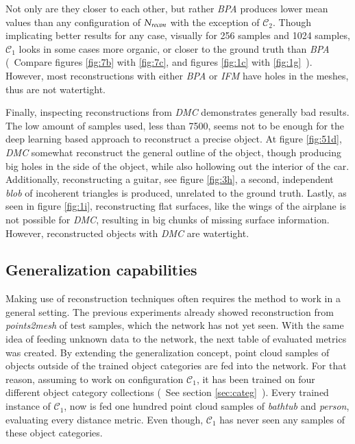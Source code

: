     Not only are they closer to each other, but rather \emph{BPA} produces lower mean values than any configuration of  $\emph{N}_{recon}$ with the exception of $\mathcal{C}_2$.
    Though implicating better results for any case, visually for 256 samples and 1024 samples, $\mathcal{C}_1$ looks in some cases more
    organic, or closer to the ground truth than \emph{BPA} (~Compare figures \ref{fig:7b} with \ref{fig:7c}, and figures \ref{fig:1c} 
    with \ref{fig:1g}~). However, most reconstructions with either \emph{BPA} or \emph{IFM} have holes in the meshes, thus are not watertight.


    Finally, inspecting reconstructions from \emph{DMC} demonstrates generally bad results. The low amount of samples used, less than 7500,
    seems not to be enough for the deep learning based approach to reconstruct a precise object. At figure \ref{fig:51d}, \emph{DMC} somewhat
    reconstruct the general outline of the object, though producing big holes in the side of the object, while also hollowing out the interior
    of the car. Additionally, reconstructing a guitar, see figure \ref{fig:3h}, a second, independent \emph{blob} of incoherent triangles is 
    produced, unrelated to the ground truth. Lastly, as seen in figure \ref{fig:1i}, reconstructing flat surfaces, like the wings of the airplane
    is not possible for \emph{DMC}, resulting in big chunks of missing surface information. However, reconstructed objects with \emph{DMC} are watertight.

\subsection{Generalization capabilities}
    Making use of reconstruction techniques often requires the method to work in a general setting.
    The previous experiments already showed reconstruction from \emph{points2mesh} of test samples,
    which the network has not yet seen. With the same idea of feeding unknown data to the network,
    the next table of evaluated metrics was created. By extending the generalization concept, 
    point cloud samples of objects outside of the trained object categories are fed into the network.
    For that reason, assuming to work on configuration $\mathcal{C}_1$, it has been trained on four different
    object category collections (~See section \ref{sec:categ}~).
    Every trained instance of $\mathcal{C}_1$, now is fed one hundred point cloud samples 
    of \emph{bathtub} and \emph{person}, evaluating every distance metric. Even though, $\mathcal{C}_1$ has never seen any samples of these object categories.


